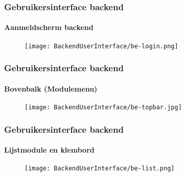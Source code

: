 
\begin{frame}[fragile]
	\frametitle{Gebruikersinterface backend}
	\framesubtitle{Aanmeldscherm backend}

	\begin{figure}
		\texttt{[image: BackendUserInterface/be-login.png]}
	\end{figure}

\end{frame}


\begin{frame}[fragile]
	\frametitle{Gebruikersinterface backend}
	\framesubtitle{Bovenbalk (Modulemenu)}

	\begin{figure}
		\texttt{[image: BackendUserInterface/be-topbar.jpg]}
	\end{figure}

\end{frame}


\begin{frame}[fragile]
	\frametitle{Gebruikersinterface backend}
	\framesubtitle{Lijstmodule en klembord}

	\begin{figure}
		\texttt{[image: BackendUserInterface/be-list.png]}
	\end{figure}

\end{frame}

